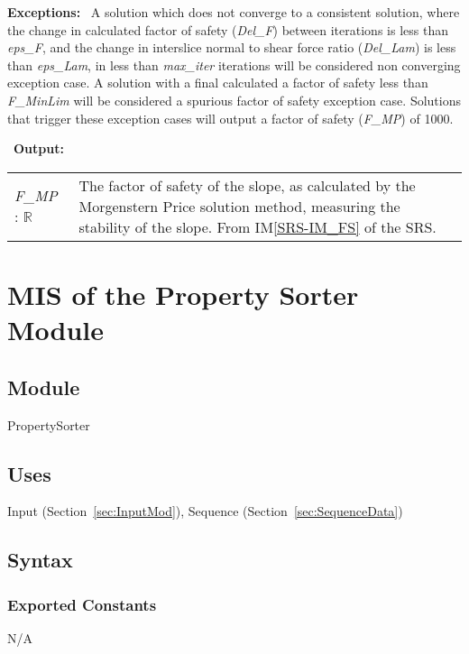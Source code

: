 \documentclass[12pt, titlepage]{article}
\begin{document}
\noindent \textbf{Exceptions:} ~\newline\noindent A solution which
does not converge to a consistent solution, where the change in
calculated factor of safety (\textit{Del\_F}) between iterations is
less than \textit{eps\_F}, and the change in interslice normal to
shear force ratio (\textit{Del\_Lam}) is less than \textit{eps\_Lam},
in less than \textit{max\_iter} iterations will be considered non
converging exception case. A solution with a final calculated a factor
of safety less than \textit{F\_MinLim} will be considered a spurious
factor of safety exception case. Solutions that trigger these
exception cases will output a factor of safety (\textit{F\_MP}) of
1000.

~\newline\noindent \textbf{Output:}
\renewcommand*{\arraystretch}{1.5}
\begin{longtable}{p{} p{}}
  \textit{F\_MP} : $\mathbb{R}$ & The factor of safety of the slope,
  as calculated by the Morgenstern Price solution method, measuring
  the stability of the slope. From IM\ref{SRS-IM_FS} of the SRS.\\
\end{longtable}


\section{MIS of the Property Sorter Module} \label{sec:PropSortMod}

\subsection{Module} 
PropertySorter

\subsection{Uses}
Input (Section~\ref{sec:InputMod}), Sequence (Section~\ref{sec:SequenceData})

\subsection{Syntax}

\subsubsection{Exported Constants}
N/A
\end{document}
